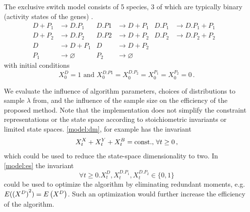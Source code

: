 
\begin{model}\label{model:es}
	The exclusive switch model consists of \num{5} species, \num{3} of which are typically binary (activity states of the genes) \cite{loinger2007stochastic}.
\begin{align*}
	D + P_1 &\xrightarrow{} D.P_1 &
	D.P1 &\xrightarrow{} D + P_1  &
	D.P_1 &\xrightarrow{} D.P_1 + P_1 \\
	D + P_2 &\xrightarrow{} D.P_2& 
	D.P2 &\xrightarrow{} D + P_2 &
	D.P_2 &\xrightarrow{} D.P_2 + P_2\\
	D &\xrightarrow{} D + P_1&
	D &\xrightarrow{} D + P_2& & &\\
	P_1 &\xrightarrow{}\varnothing & P_2 & \xrightarrow{} \varnothing
\end{align*}
with initial conditions 
	\[X^D_0=1 \text{ and } X^{D.P1}_0=X^{D.{P_2}}_0=X^{P_1}_0=X^{P_2}_0=0\,.\]
\end{model}

We evaluate the influence of algorithm parameters, choices of distributions
to sample $\lambda$ from, and the influence of the sample size on the efficiency of
the proposed method.
Note that the implementation does not simplify the constraint representations
or the state space according to stoichiometric invariants or limited
state spaces.
\autoref{model:dm}, for example has the invariant 
\[
	X^X_t+X^Y_t+X^B_t=\text{const.}$, $\forall t\geq 0\,,
\]
which could be used to reduce the state-space dimensionality to two.
In \autoref{model:es} the invariant 
\[
	\forall t\geq 0.X^D_t,X^{D.{P_1}}_t,X^{D.{P_2}}_t\in\{0,1\}
\]
could be used to optimize the algorithm by eliminating redundant moments, e.g.\ ${E}({(X^D)}^2)={E}\left(X^D\right)$.
Such an optimization would further increase the efficiency of the algorithm.




